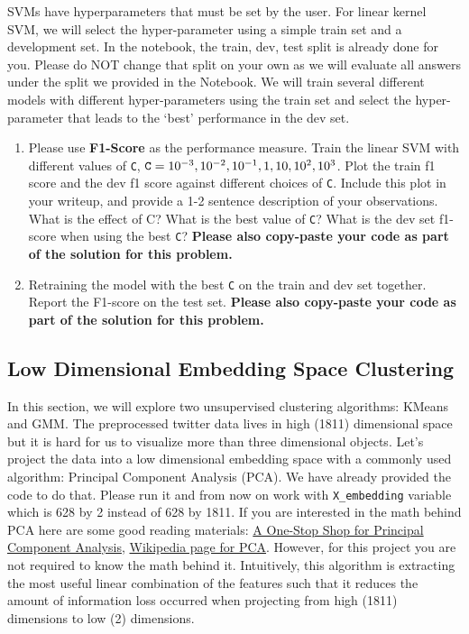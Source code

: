 \documentclass[11pt]{article}
\begin{document}
SVMs have hyperparameters that must be set by the user. For linear kernel SVM, we will select the hyper-parameter using a simple train set and a development set. In the notebook, the train, dev, test split is already done for you. Please do NOT change that split on your own as we will evaluate all answers under the  split we provided in the Notebook. We will train several different models with different hyper-parameters using the train set and select the hyper-parameter that leads to the `best' performance in the dev set. 
\begin{enumerate}

\item {} Please use \textbf{F1-Score} as the performance measure. Train the linear SVM with different values of \verb|C|, $\verb|C| = 10^{-3}, 10^{-2}, 10^{-1}, 1, 10, 10^{2}, 10^{3}$. Plot the train f1 score and the dev f1 score against different choices of \verb|C|.  Include this plot in your writeup, and provide a 1-2 sentence description of your observations. What is the effect of C? What is the best value of \verb|C|? What is the dev set f1-score when using the best \verb|C|? \textbf{Please also copy-paste your code as part of the solution for this problem.}\newline
\solution{}


\item {} Retraining the model with the best \verb|C| on the train and dev set together. Report the F1-score on the test set. \textbf{Please also copy-paste your code as part of the solution for this problem.}\newline
\solution{}

\end{enumerate}


\subsection{Low Dimensional Embedding Space Clustering }\label{sec:test}
In this section, we will explore two unsupervised clustering algorithms: KMeans and GMM. The preprocessed twitter data lives in high (1811) dimensional space but it is hard for us to visualize more than three dimensional objects. Let's project the data into a low dimensional embedding space with a commonly used algorithm: Principal Component Analysis (PCA). We have already provided the code to do that. Please run it and from now on work with \verb|X_embedding| variable which is 628 by 2 instead of 628 by 1811. If you are interested in the math behind PCA here are some good reading materials: \href{https://towardsdatascience.com/a-one-stop-shop-for-principal-component-analysis-5582fb7e0a9c}{A One-Stop Shop for Principal Component Analysis}, \href{https://en.wikipedia.org/wiki/Principal_component_analysis}{Wikipedia page for PCA}. However, for this project you are not required to know the math behind it. Intuitively, this algorithm is extracting the most useful linear combination of the features such that it reduces the amount of information loss occurred when projecting from high (1811) dimensions to low (2) dimensions. 
\end{document}
